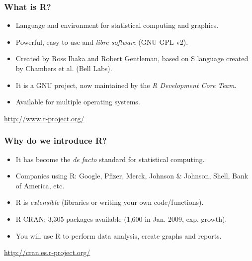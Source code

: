 \documentclass{beamer}
\begin{document}
\begin{frame}

\frametitle{What is R?}
\begin{itemize}
\item Language and environment for statistical computing and graphics.
\item Powerful, easy-to-use and \textit{libre software} (GNU GPL v2).
\item Created by Ross Ihaka and Robert Gentleman, based on S language created by Chambers et al. (Bell Labs).
\item It is a GNU project, now maintained by the \textit{R Development Core Team}.
\item Available for multiple operating systems.
\end{itemize}

\begin{flushright}
 \url{http://www.r-project.org/}
\end{flushright}


\end{frame}


\begin{frame}

\frametitle{Why do we introduce R?}
\begin{itemize}
\item It has become the \textit{de facto} standard for statistical computing.
\item Companies using R: Google, Pfizer, Merck, Johnson \& Johnson, Shell, Bank of America, etc.
\item R is \textit{extensible} (libraries or writing your own code/functions).
\item R CRAN: 3,305 packages available (1,600 in Jan. 2009, exp. growth).
\item You will use R to perform data analysis, create graphs and reports.
\end{itemize}

\begin{flushright}
 \url{http://cran.es.r-project.org/}
\end{flushright}

\end{frame}

\end{document}

